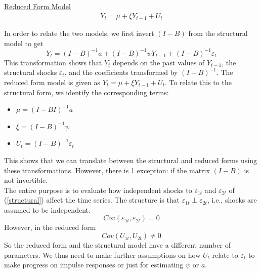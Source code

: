 \underline{Reduced Form Model}
\begin{align*}
    Y_t=\mu + \xi Y_{t-1} + U_t
\end{align*}


In order to relate the two models, we first invert $(I-B)$ from the structural model to get \[
Y_t = (I-B)^{-1} a + (I-B)^{-1} \psi Y_{t-1}+ (I-B)^{-1}\varepsilon_t
\]
This transformation shows that $Y_t$ depends on the past values of $Y_{t-1}$, the structural shocks $\varepsilon_t$, and the coefficients transformed by $(I-B)^{-1}$. The reduced form model is given as $Y_t = \mu + \xi Y_{t-1} + U_t$. To relate this to the structural form, we identify the corresponding terms:
\begin{itemize}
    \item $\mu = (I-BI)^{-1} a$
    \item $\xi = (I-B)^{-1} \psi$
    \item $U_t = (I-B)^{-1} \varepsilon_t$
\end{itemize}

This shows that we can translate between the structural and reduced forms using these transformations. However, there is 1 exception: if the matrix $(I-B)$ is not invertible. \\

The entire purpose is to evaluate how independent shocks to $\varepsilon_{1t}$ and $\varepsilon_{2t}$ of (\ref{structural}) affect the time series. The structure is that $\varepsilon_{1t} \perp \varepsilon_{2t}$, i.e., shocks are assumed to be independent. \[
Cov(\varepsilon_{1t}, \varepsilon_{2t}) = 0
\]
However, in the reduced form \[
Cov(U_{1t},U_{2t})\neq 0
\] So the reduced form and the structural model have a different number of parameters. We thus need to make further assumptions on how $U_t$ relate to $\varepsilon_t$ to make progress on impulse responses or just for estimating $\psi$ or $a$.\\


